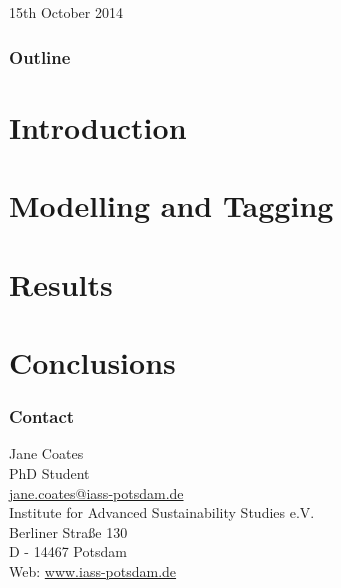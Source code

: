 \documentclass[center]{beamer}
\begin{document}


\begin{frame} %
    \vspace{3cm}
    {\Large \textcolor{\highlightcolor}{\textbf{\slidesettitle}}}\\ 
    \vspace{1cm}
    {\Large \textcolor{GreyIASS}{\textbf{\authorname}}} \\
    \vspace{.5cm}
    {\large \textcolor{GreyIASS}{15th October 2014}} 
\end{frame}



\begin{frame}
    \frametitle{Outline}
    \tableofcontents 
\end{frame}
\centering
\section{Introduction}


\section{Modelling and Tagging}
 

\section{Results}


\section{Conclusions}


\begin{frame} %
    \frametitle{Contact}

    \begin{flushleft}
        \textcolor{BlueIASS} {
            Jane Coates\\
            PhD Student\\
            \href{mailto:jane.coates@iass-potsdam.de}{jane.coates@iass-potsdam.de} \\ \vspace{5mm}
            Institute for Advanced Sustainability Studies e.V. \\
            Berliner Stra{\ss}e 130 \\
            D - 14467 Potsdam \\
            Web: \url{www.iass-potsdam.de}
        }
    \end{flushleft}

\end{frame}

% 
\end{document}
